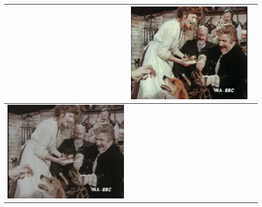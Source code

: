 \begin{table}[H]
\begin{tabular}{|c|c|c|}
\begin{minipage}{.29\textwidth}
  \end{minipage} & 
  \begin{minipage}{.29\textwidth}
    \includegraphics[width=\textwidth,height=\textheight,keepaspectratio]{images/pitie_result1}
  \end{minipage} \\
    \hline
  \begin{minipage}{.29\textwidth}
    \includegraphics[width=\textwidth,height=\textheight,keepaspectratio]{images/pitie_original}
  \end{minipage} & 
  \begin{minipage}{.29\textwidth}

\end{minipage}
\end{tabular}
\end{table}
